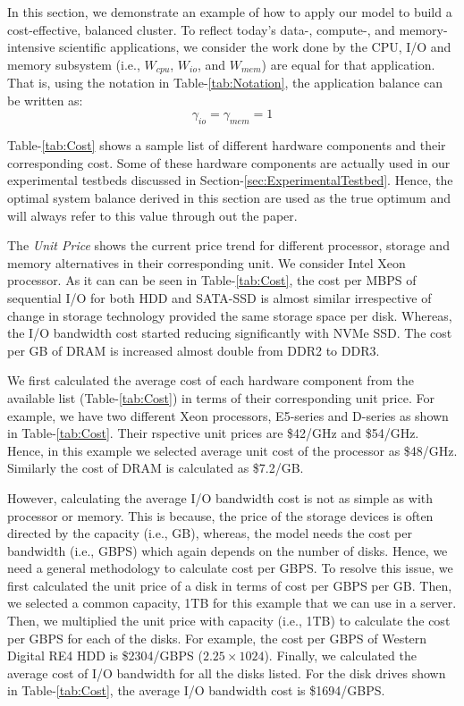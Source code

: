 \documentclass[journal]{IEEEtran}
\begin{document}
In this section, we demonstrate an example of how to apply our model to build a cost-effective, balanced cluster. To reflect today's data-, compute-, and memory-intensive scientific applications, we consider the work done by the CPU, I/O and memory subsystem (i.e., $W_{cpu}$, $W_{io}$, and $W_{mem}$) are equal for that application. That is, using the notation in Table-\ref{tab:Notation}, the application balance  can be written as:
\begin{equation} \label{eqn:PractAppBal}
\gamma_{io} = \gamma_{mem} = 1
\end{equation}

Table-\ref{tab:Cost} shows a sample list of different hardware components and their corresponding cost. Some of these hardware components are actually used in our experimental testbeds discussed in Section-\ref{sec:ExperimentalTestbed}. Hence, the optimal system balance derived in this section are used as the true optimum and will always refer to this value through out the paper. 

The \textit{Unit Price} shows the current price trend  for different processor, storage and memory alternatives in their corresponding unit. We consider Intel Xeon processor. As it can can be seen in  Table-\ref{tab:Cost}, the cost per MBPS of sequential I/O for both HDD and SATA-SSD is almost similar irrespective of change in storage technology provided the same storage space per disk. Whereas, the I/O bandwidth cost started reducing significantly with NVMe SSD. The cost per GB of DRAM is increased almost double from DDR2 to DDR3. 

We first calculated the average cost of each hardware component from the available list (Table-\ref{tab:Cost}) in terms of their corresponding unit price. For example, we have two different Xeon processors, E5-series and D-series as shown in Table-\ref{tab:Cost}. Their rspective unit prices are \$42/GHz and \$54/GHz. Hence, in this example we selected average unit cost of the processor as \$48/GHz. Similarly the cost of DRAM is calculated as \$7.2/GB. 

However, calculating the average I/O bandwidth cost is not as simple as with processor or memory. This is because, the price of the storage devices is often directed by the capacity (i.e., GB), whereas, the model needs the cost per bandwidth (i.e., GBPS) which again depends on the number of disks. Hence, we need a general methodology to calculate cost per GBPS. To resolve this issue, we first calculated the unit price of a disk in terms of cost per GBPS per GB. Then, we selected a common capacity, 1TB for this example that we can use in a server.  Then, we multiplied the unit price with capacity (i.e., 1TB) to calculate the cost per GBPS for each of the disks. For example, the cost per GBPS of Western Digital RE4 HDD is \$2304/GBPS ($2.25 \times 1024$). Finally, we calculated the average cost of I/O bandwidth for all the disks listed. For the disk drives shown in Table-\ref{tab:Cost}, the average I/O bandwidth cost is \$1694/GBPS. 
\end{document}
